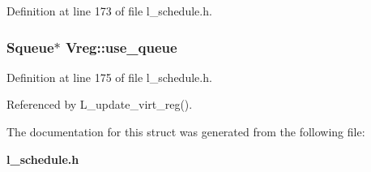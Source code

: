 Definition at line 173 of file l\_\-schedule.h.
\subsubsection{\setlength{\rightskip}{0pt plus 5cm}\bf{Squeue}$\ast$ \bf{Vreg::use\_\-queue}}\label{structVreg_3e675d1a9707ce8ebedbd27bef25dae7}




Definition at line 175 of file l\_\-schedule.h.

Referenced by L\_\-update\_\-virt\_\-reg().

The documentation for this struct was generated from the following file:\begin{CompactItemize}
\item 
\bf{l\_\-schedule.h}\end{CompactItemize}

